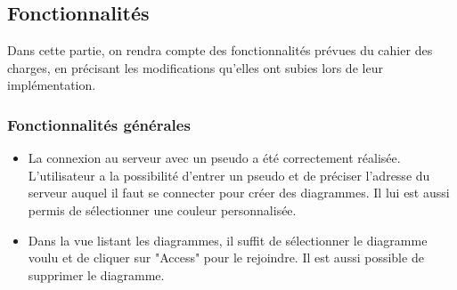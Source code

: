 \newpage
\subsection{Fonctionnalités}
Dans cette partie, on rendra compte des fonctionnalités prévues du cahier des charges, en précisant les modifications qu'elles ont subies lors de leur implémentation.

\subsubsection{Fonctionnalités générales}
	\begin{itemize}
		\item La connexion au serveur avec un pseudo a été correctement réalisée.
		L'utilisateur a la possibilité d'entrer un pseudo et de préciser l'adresse du serveur auquel il faut se connecter pour créer des diagrammes.
		Il lui est aussi permis de sélectionner une couleur personnalisée. 		
		\item Dans la vue listant les diagrammes, il suffit de sélectionner le diagramme voulu et de cliquer sur "Access" pour le rejoindre. Il est aussi possible de supprimer le diagramme.
		

\end{itemize}
